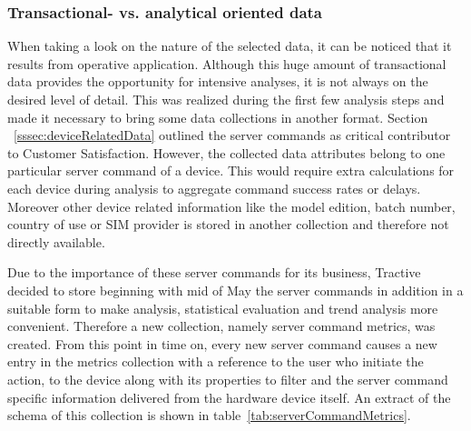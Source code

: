 \subsubsection{Transactional- vs. analytical oriented data}
When taking a look on the nature of the selected data, it can be noticed that it results from operative application. Although this huge amount of transactional data provides the opportunity for intensive analyses, it is not always on the desired level of detail. This was realized during the first few analysis steps and made it necessary to bring some data collections in another format. Section ~\ref{sssec:deviceRelatedData} outlined the server commands as critical contributor to Customer Satisfaction. However, the collected data attributes belong to one particular server command of a device. This would require extra calculations for each device during analysis to aggregate command success rates or delays. Moreover other device related information like the model edition, batch number, country of use or SIM provider is stored in another collection and therefore not directly available. 

Due to the importance of these server commands for its business, Tractive decided to store beginning with mid of May the server commands in addition in a suitable form to make analysis, statistical evaluation and trend analysis more convenient. Therefore a new collection, namely server command metrics, was created. From this point in time on, every new server command causes a new entry in the metrics collection with a reference to the user who initiate the action, to the device along with its properties to filter and the server command specific information delivered from the hardware device itself. An extract of the schema of this collection is shown in table~\ref{tab:serverCommandMetrics}. 

